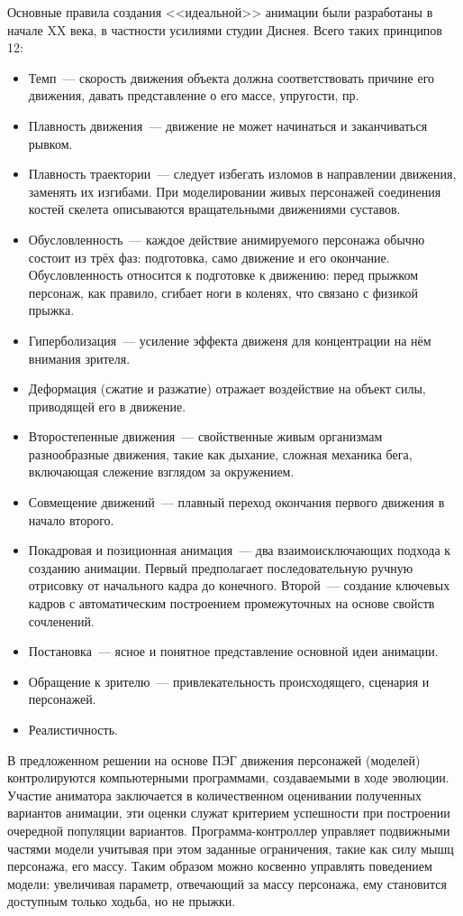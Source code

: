 Основные правила создания <<идеальной>> анимации были разработаны в начале XX века, в частности усилиями студии Диснея. Всего таких принципов 12:
\begin{itemize}
  \item Темп~--- скорость движения объекта должна соответствовать причине его движения, давать представление о его массе, упругости, пр.
  \item Плавность движения~--- движение не может начинаться и заканчиваться рывком.
  \item Плавность траектории~--- следует избегать изломов в направлении движения, заменять их изгибами. При моделировании живых персонажей соединения костей скелета описываются вращательными движениями суставов.
  \item Обусловленность~--- каждое действие анимируемого персонажа обычно состоит из трёх фаз: подготовка, само движение и его окончание. Обусловленность относится к подготовке к движению: перед прыжком персонаж, как правило, сгибает ноги в коленях, что связано с физикой прыжка.
  \item Гиперболизация~--- усиление эффекта движеня для концентрации на нём внимания зрителя.
  \item Деформация (сжатие и разжатие) отражает воздействие на объект силы, приводящей его в движение.
  \item Второстепенные движения~--- свойственные живым организмам разнообразные движения, такие как дыхание, сложная механика бега, включающая слежение взглядом за окружением.
  \item Совмещение движений~--- плавный переход окончания первого движения в начало второго.
  \item Покадровая и позиционная анимация~--- два взаимоисключающих подхода к созданию анимации. Первый предполагает последовательную ручную отрисовку от начального кадра до конечного. Второй~--- создание ключевых кадров с автоматическим построением промежуточных на основе свойств сочленений.
  \item Постановка~--- ясное и понятное представление основной идеи анимации.
  \item Обращение к зрителю~--- привлекательность происходящего, сценария и персонажей.
  \item Реалистичность.
\end{itemize}

В предложенном решении на основе ПЭГ движения персонажей (моделей) контролируются компьютерными программами, создаваемыми в ходе эволюции. Участие аниматора заключается в количественном оценивании полученных вариантов анимации, эти оценки служат критерием успешности при построении очередной популяции вариантов. Программа-контроллер управляет подвижными частями модели учитывая при этом заданные ограничения, такие как силу мышц персонажа, его массу. Таким образом можно косвенно управлять поведением модели: увеличивая параметр, отвечающий за массу персонажа, ему становится доступным только ходьба, но не прыжки.

